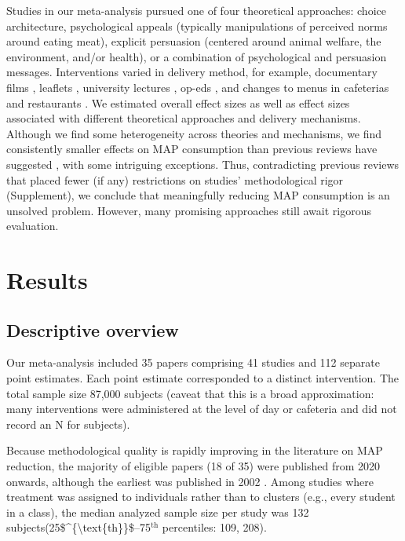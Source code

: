 \documentclass[sn-nature,referee,pdflatex]{sn-jnl}
\begin{document}
Studies in our meta-analysis pursued one of four theoretical approaches:
choice architecture, psychological appeals (typically manipulations of
perceived norms around eating meat), explicit persuasion (centered
around animal welfare, the environment, and/or health), or a combination
of psychological and persuasion messages. Interventions varied in
delivery method, for example, documentary films
\citep{mathur2021effectiveness}, leaflets \citep{peacock2017},
university lectures \citep{jalil2023}, op-eds \citep{haile2021}, and
changes to menus in cafeterias \citep{andersson2021} and restaurants
\citep{coker2022, sparkman2021}. We estimated overall effect sizes as
well as effect sizes associated with different theoretical approaches
and delivery mechanisms. Although we find some heterogeneity across
theories and mechanisms, we find consistently smaller effects on MAP
consumption than previous reviews have suggested
\citep{bianchi2018restructuring, byerly2018, chang2023, harguess2020, kwasny2022, mathur2021meta, meier2022},
with some intriguing exceptions. Thus, contradicting previous reviews
that placed fewer (if any) restrictions on studies' methodological rigor
(Supplement), we conclude that meaningfully reducing MAP consumption is
an unsolved problem. However, many promising approaches still await
rigorous evaluation.

\section{Results}\label{sec2}

\subsection{Descriptive overview}\label{sec2.1}

Our meta-analysis included 35 papers comprising 41 studies and 112
separate point estimates. Each point estimate corresponded to a distinct
intervention. The total sample size 87,000 subjects (caveat that this is
a broad approximation: many interventions were administered at the level
of day or cafeteria and did not record an N for subjects).

Because methodological quality is rapidly improving in the literature on
MAP reduction, the majority of eligible papers (18 of 35) were published
from 2020 onwards, although the earliest was published in 2002
\citep{allen2002}. Among studies where treatment was assigned to
individuals rather than to clusters (e.g., every student in a class),
the median analyzed sample size per study was 132
subjects(25\$\^{}\{\textbackslash text\{th\}\}\$--75\(^{\text{th}}\)
percentiles: 109, 208).
\end{document}
